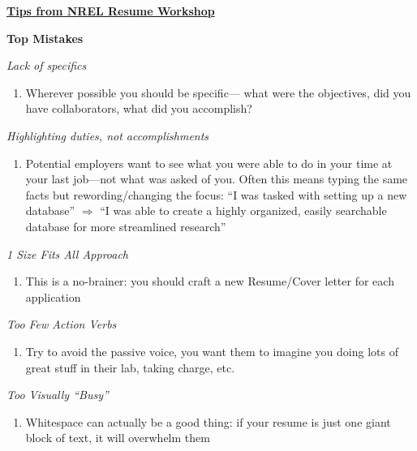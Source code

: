 \documentclass[12pt]{article}
\begin{document}
\begin{spacing}{1.5}
\begin{centering}
\underline{\huge{\textbf{Tips from NREL Resume Workshop}}}
\end{centering}
\vspace{5mm}

 \begin{enumerate}
   {\LARGE \item \textbf{Top Mistakes}}
   		\begin{enumerate}
    		 	{\large \item \emph{Lack of specifics}}
     				\begin{enumerate}
        				 \item[] Wherever possible you should be specific--- what were the objectives, did you have collaborators, what did you accomplish?
       			\end{enumerate}
       		{\large \item \emph{Highlighting duties, not accomplishments}}
    			 	\begin{enumerate}
         				\item[] Potential employers want to see what you were able to do in your time at your last job---not what was asked of you. Often this means typing the same facts but rewording/changing the focus: ``I was tasked with setting up a new 	database'' $\Rightarrow$ ``I was able to create a highly organized, easily searchable database for more streamlined research''
     				\end{enumerate}
     			{\large \item \emph{1 Size Fits All Approach}}
    				 \begin{enumerate}
         				\item[] This is a no-brainer: you should craft a new Resume/Cover letter for each application
      				 \end{enumerate}
     			{\large \item \emph{Too Few Action Verbs}}
     				\begin{enumerate}
        				 \item[] Try to avoid the passive voice, you want them to imagine you doing lots of great stuff in their lab, taking charge, etc.
      				 \end{enumerate}
     			{\large \item \emph{Too Visually ``Busy''}}
     				\begin{enumerate}
				         \item[] Whitespace can actually be a good thing: if your resume is just one giant block of text, it will overwhelm them
			       \end{enumerate}
 

\end{enumerate}
\end{enumerate}
\end{spacing}
\end{document}
